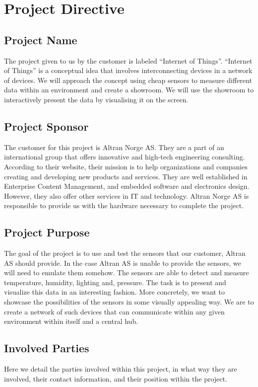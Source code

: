 \documentclass[../document.tex]{subfiles}
\begin{document}
\section{Project Directive}

\subsection{Project Name}
The project given to us by the customer is labeled “Internet of Things”. “Internet of Things” is a conceptual idea that involves interconnecting devices in a network of devices. We will approach the concept using cheap sensors to measure different data within an environment and create a showroom. We will use the showroom to interactively present the data by visualising it on the screen.

\subsection{Project Sponsor}
The customer for this project is \gls{Altran} Norge AS. They are a part of an international group that offers innovative and high-tech engineering consulting. According to their website, their mission is to help organizations and companies creating and developing new products and services. They are well established in Enterprise Content Management, and embedded software and electronics design. However, they also offer other services in IT and technology. \gls{Altran} Norge AS is responsible to provide us with the hardware necessary to complete the project.

\subsection{Project Purpose}
The goal of the project is to use and test the sensors that our customer, \gls{Altran} AS should provide. In the case \gls{Altran} AS is unable to provide the sensors, we will need to emulate them somehow. The sensors are able to detect and measure temperature, humidity, lighting and, pressure. The task is to present and visualize this data in an interesting fashion. More concretely, we want to showcase the possibilities of the sensors in some visually appealing way. We are to create a network of such devices that can communicate within any given environment within itself and a central hub.

\subsection{Involved Parties}
Here we detail the parties involved within this project, in what way they are involved, their contact information, and their position within the project.
\end{document}

